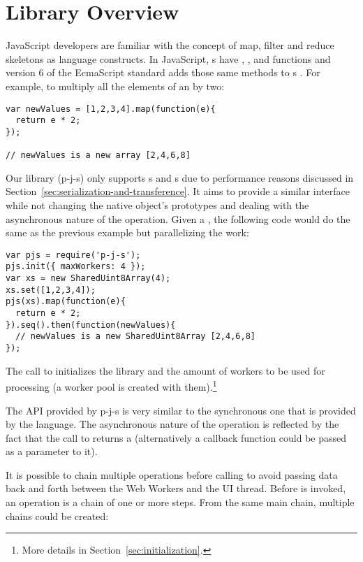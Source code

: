 \section{Library Overview}\label{sec:overview}
JavaScript developers are familiar with the concept of map, filter and reduce skeletons as language constructs. In JavaScript, s have , , and  functions and version 6 of the EcmaScript standard adds those same methods to \ttarray{}s \cite{es6-ta}. For example, to multiply all the elements of an  by two:
\begin{lstlisting}[caption=Example creating a new array with the values of the original one multiplied by two]
var newValues = [1,2,3,4].map(function(e){
  return e * 2;
});

// newValues is a new array [2,4,6,8]
\end{lstlisting}

Our library (p-j-s) only supports \tstarray{}s and \ttarray{}s due to performance reasons discussed in Section~\ref{sec:serialization-and-transference}. It aims to provide a similar interface while not changing the native object's prototypes and dealing with the asynchronous nature of the operation. Given a \tstarray{}, the following code would do the same as the previous example but parallelizing the work:
\begin{lstlisting}[caption=Example creating a new array with the values of the original one multiplied by two using p-j-s]
var pjs = require('p-j-s');
pjs.init({ maxWorkers: 4 });
var xs = new SharedUint8Array(4);
xs.set([1,2,3,4]);
pjs(xs).map(function(e){
  return e * 2;
}).seq().then(function(newValues){
  // newValues is a new SharedUint8Array [2,4,6,8]
});
\end{lstlisting}

The call to  initializes the library and the amount of workers to be used for processing (a worker pool is created with them).\footnote{More details in Section~\ref{sec:initialization}.}

The API provided by p-j-s \cite{pjs-api} is very similar to the synchronous one that is provided by the language. The asynchronous nature of the operation is reflected by the fact that the call to  returns a  \cite{promise} (alternatively a callback function could be passed as a parameter to it).

It is possible to chain multiple operations before calling  to avoid passing data back and forth between the Web Workers and the UI thread. Before  is invoked, an operation is a chain of one or more steps. From the same main chain, multiple chains could be created:

